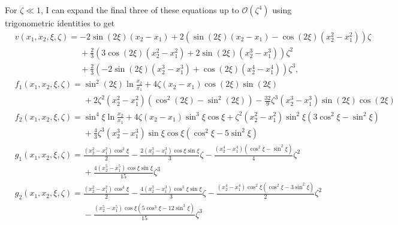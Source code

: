 \documentclass[12pt]{article}
\begin{document}
For $\zeta\ll1$, I can expand the final three of these equations up to $\mathcal{O}(\zeta^4)$ using trigonometric identities to get
\begin{subequations}
\begin{align}
&v(x_1,x_2,\xi,\zeta)=-2\sin(2\xi)(x_2-x_1)+2(\sin(2\xi)(x_2-x_1)-\cos(2\xi)(x_2^2-x_1^2))\zeta\nonumber\\
&\phantom{v(x_1,x_2,\xi,\zeta)=}+\frac{2}{3}(3\cos(2\xi)(x_2^2-x_1^2)+2\sin(2\xi)(x_2^3-x_1^3))\zeta^2\nonumber\\
&\phantom{v(x_1,x_2,\xi,\zeta)=}+\frac{2}{3}(-2\sin(2\xi)(x_2^3-x_1^3)+\cos(2\xi)(x_2^4-x_1^4))\zeta^3,\\
&f_1(x_1,x_2,\xi,\zeta)=\sin^2\left(2\xi\right)\ln\frac{x_2}{x_1}+4\zeta(x_2-x_1)\cos(2\xi)\sin(2\xi)\nonumber\\
&\phantom{f_1(x_1,x_2,\xi,\zeta)=}+2\zeta^2(x_2^2-x_1^2)\left(\cos^2(2\xi)-\sin^2(2\xi)\right)-\frac{32}{9}\zeta^3(x_2^3-x_1^3)\sin(2\xi)\cos(2\xi)\\
&f_2(x_1,x_2,\xi,\zeta)=\sin^4\xi\ln\frac{x_2}{x_1}+4\zeta(x_2-x_1)\sin^3\xi\cos\xi+\zeta^2(x_2^2-x_1^2)\sin^2\xi(3\cos^2\xi-\sin^2\xi)\nonumber\\
&\phantom{f_2(x_1,x_2,\xi,\zeta)=}+\frac{4}{3}\zeta^3(x_2^3-x_1^3)\sin\xi\cos\xi\left(\cos^2\xi-5\sin^2\xi\right)\\
&g_1(x_1,x_2,\xi,\zeta)=\frac{(x_2^2-x_1^2)\cos^2\xi}{2}-\frac{2(x_2^3-x_1^3)\cos\xi\sin\xi}{3}\zeta-\frac{(x_2^4-x_1^4)(\cos^2\xi-\sin^2\xi)}{4}\zeta^2\nonumber\\
&\phantom{g_1(x_1,x_2,\xi,\zeta)=}+\frac{4(x_2^5-x_1^5)\cos\xi\sin\xi}{15}\zeta^3\nonumber\\
&g_2(x_1,x_2,\xi,\zeta)=\frac{(x_2^2-x_1^2)\cos^4\xi}{2}-\frac{4(x_2^3-x_1^3)\cos^3\xi\sin\xi}{3}\zeta-\frac{(x_2^4-x_1^4)\cos^2\xi(\cos^2\xi-3\sin^2\xi)}{2}\zeta^2\nonumber\\
&\phantom{g_2(x_1,x_2,\xi,\zeta)=}-\frac{(x_2^5-x_1^5)\cos\xi(5\cos^3\xi-12\sin^3\xi)}{15}\zeta^3
\end{align}
\end{subequations}
\end{document}
